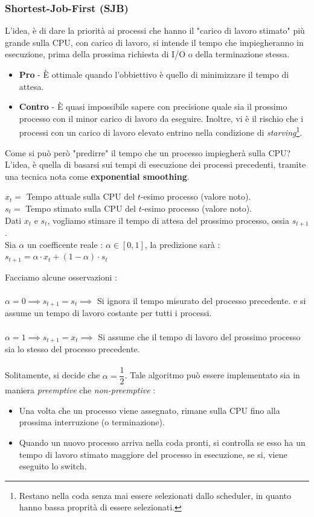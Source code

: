 \documentclass[12pt, letterpaper]{article}
\newcommand{\acc}{\\\hphantom{}\\}
\begin{document}
\subsubsection{Shortest-Job-First (SJB)}
L'idea, è di dare la priorità ai processi che hanno il 
"carico di lavoro stimato" più grande sulla CPU, con carico di lavoro, si 
intende il tempo che impiegheranno in esecuzione, prima della prossima 
richiesta di I/O o della terminazione stessa.\begin{itemize}
    \item \textbf{Pro} - È ottimale quando l'obbiettivo è quello di 
    minimizzare il tempo di attesa.
    \item \textbf{Contro} - È quasi impossibile sapere con precisione 
    quale sia il prossimo processo con il minor carico di lavoro da eseguire.
    Inoltre, vi è il rischio che i processi con un carico di lavoro 
    elevato entrino nella condizione di \textit{starving}\footnote{
        Restano nella coda senza mai essere selezionati dallo scheduler, 
        in quanto hanno bassa proprità di essere selezionati.
    }.
\end{itemize}
Come si può però "predirre" il tempo che un processo impiegherà sulla 
CPU? L'idea, è quella di basarsi sui tempi di esecuzione dei processi 
precedenti, tramite una tecnica nota come \textbf{exponential smoothing}.\begin{center}
    \(x_t=\) Tempo attuale sulla CPU del \(t\)-esimo processo (valore noto). 
    \\\(s_t=\)  Tempo stimato sulla CPU del \(t\)-esimo processo (valore noto).
    \\Dati \(x_t\) e \(s_t\), vogliamo stimare il tempo di attesa del prossimo processo, 
    ossia \(s_{t+1}\). \\
    Sia \(\alpha\) un coefficente reale : \(\alpha\in [0,1]\), la predizione sarà :\\
\(s_{t+1}=\alpha\cdot x_t+(1-\alpha)\cdot s_t\)
\end{center}
Facciamo alcune osservazioni :\acc
    \(\alpha=0\implies s_{t+1}=s_t\implies\) Si ignora il tempo misurato del processo 
    precedente. e si assume un tempo di lavoro costante per tutti i processi.\acc 
    \(\alpha=1\implies s_{t+1}=x_t\implies\) Si assume che il tempo di lavoro 
    del prossimo processo sia lo stesso del processo precedente.\acc 
Solitamente, si decide che \(\alpha=\dfrac{1}{2}\). Tale algoritmo può essere implementato 
sia in maniera \textit{preemptive} che \textit{non-preemptive} : \begin{itemize}
    \item Una volta che un processo viene assegnato, rimane sulla CPU fino alla prossima 
    interruzione (o terminazione).
    \item Quando un nuovo processo arriva nella coda pronti, si controlla se 
    esso ha un tempo di lavoro stimato maggiore del processo in esecuzione, se si, 
    viene eseguito lo switch.
\end{itemize}
\end{document}
